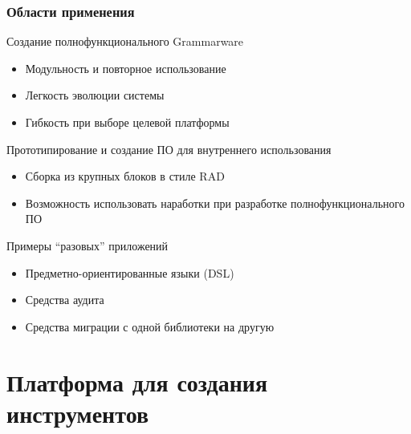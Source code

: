 \documentclass[paper=screen,10pt,unicode]{beamer}
\begin{document}
\begin{frame}
	\frametitle{Области применения}

	\begin{block}{Создание полнофункционального Grammarware}
			\begin{itemize}
				\item Модульность и повторное использование
				\item Легкость эволюции системы
				\item Гибкость при выборе целевой платформы
			\end{itemize}
	\end{block}
	\begin{block}{Прототипирование и создание ПО для внутреннего использования}
			\begin{itemize}
				\item Сборка из крупных блоков в стиле RAD
				\item Возможность использовать наработки при разработке полнофункционального ПО 
			\end{itemize}
	\end{block}
	\begin{block}{Примеры ``разовых'' приложений}
		\begin{itemize}
			\item Предметно-ориентированные языки (DSL)
			\item Средства аудита
			\item Средства миграции с одной библиотеки на другую
		\end{itemize}
	\end{block}
\end{frame}

\section{Платформа для создания инструментов}
\end{document}
